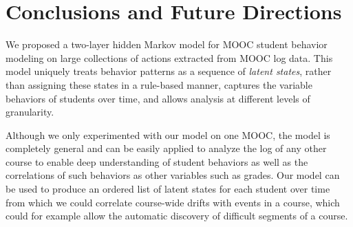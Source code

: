 \section{Conclusions and Future Directions}
We proposed a two-layer hidden Markov model for MOOC student behavior
modeling on large collections of actions extracted from MOOC log data. This
model uniquely treats behavior patterns as a sequence of \emph{latent states},
rather than assigning these states in a rule-based manner, captures the
variable behaviors of students over time, and allows analysis at different
levels of granularity.

Although we only experimented with our model on one MOOC, the model is
completely general and can be easily applied to analyze the log of any
other course to enable deep understanding of student behaviors as well as
the correlations of such behaviors as other variables such as grades.
Our model can be used to produce an ordered list of latent states for each
student over time from which we could correlate course-wide drifts with
events in a course, which could for example allow the automatic discovery
of difficult segments of a course.
